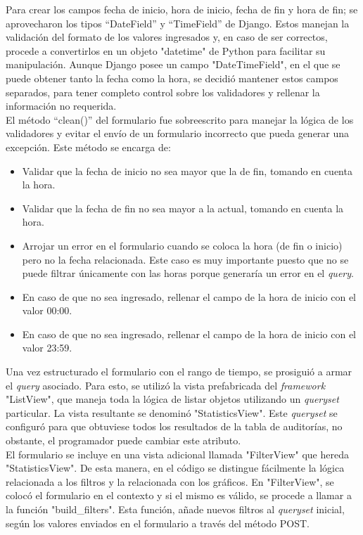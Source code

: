Para crear los campos fecha de inicio, hora de inicio, fecha de fin y hora de fin; se aprovecharon los tipos “DateField” y “TimeField” de Django. Estos manejan la validación del formato de los valores ingresados y, en caso de ser correctos, procede a convertirlos en un objeto "datetime" de Python para facilitar su manipulación. Aunque Django posee un campo "DateTimeField", en el que se puede obtener tanto la fecha como la hora, se decidió mantener estos campos separados, para tener completo control sobre los validadores y rellenar la información no requerida. \\

El método “clean()” del formulario fue sobreescrito para manejar la lógica de los validadores y evitar el envío de un formulario incorrecto que pueda generar una excepción. Este método se encarga de:

\begin{itemize}
    \item Validar que la fecha de inicio no sea mayor que la de fin, tomando en cuenta la hora.
    \item Validar que la fecha de fin no sea mayor a la actual, tomando en cuenta la hora.
    \item Arrojar un error en el formulario cuando se coloca la hora (de fin o inicio) pero no la fecha relacionada. Este caso es muy importante puesto que no se puede filtrar únicamente con las horas porque generaría un error en el \textit{query}.
    \item En caso de que no sea ingresado, rellenar el campo de la hora de inicio con el valor 00:00.
    \item En caso de que no sea ingresado, rellenar el campo de la hora de inicio con el valor 23:59.
\end{itemize}


Una vez estructurado el formulario con el rango de tiempo, se prosiguió a armar el \textit{query} asociado. Para esto, se utilizó la vista prefabricada del \textit{framework} "ListView", que maneja toda la lógica de listar objetos utilizando un \textit{queryset} particular. La vista resultante se denominó "StatisticsView". Este \textit{queryset}  se configuró para que obtuviese todos los resultados de la tabla de auditorías, no obstante, el programador puede cambiar este atributo.\\

El formulario se incluye en una vista adicional llamada "FilterView" que hereda "StatisticsView". De esta manera, en el código se distingue fácilmente la lógica relacionada a los filtros y la relacionada con los gráficos. En "FilterView", se colocó el formulario en el contexto y si el mismo es válido, se procede a llamar a la función "build\_filters". Esta función, añade nuevos filtros al \textit{queryset} inicial, según los valores enviados en el formulario a través del método POST. \\

